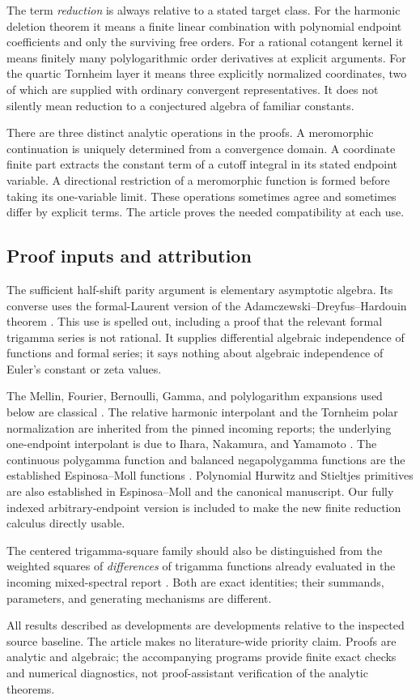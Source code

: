 The term \emph{reduction} is always relative to a stated target class.
For the harmonic deletion theorem it means a finite linear combination
with polynomial endpoint coefficients and only the surviving free
orders. For a rational cotangent kernel it means finitely many
polylogarithmic order derivatives at explicit arguments. For the
quartic Tornheim layer it means three explicitly normalized
coordinates, two of which are supplied with ordinary convergent
representatives. It does not silently mean reduction to a conjectured
algebra of familiar constants.

There are three distinct analytic operations in the proofs.
A meromorphic continuation is uniquely determined from a convergence
domain. A coordinate finite part extracts the constant term of a
cutoff integral in its stated endpoint variable. A directional
restriction of a meromorphic function is formed before taking its
one-variable limit. These operations sometimes agree and sometimes
differ by explicit terms. The article proves the needed compatibility
at each use.

\subsection{Proof inputs and attribution}

The sufficient half-shift parity argument is elementary asymptotic
algebra. Its converse uses the formal-Laurent version of the
Adamczewski--Dreyfus--Hardouin theorem
\cite[Theorem~1.2]{ghp:ADH}. This use is spelled out, including a
proof that the relevant formal trigamma series is not rational.
It supplies differential algebraic independence of functions and
formal series; it says nothing about algebraic independence of
Euler's constant or zeta values.

The Mellin, Fourier, Bernoulli, Gamma, and polylogarithm expansions
used below are classical \cite{DLMF}. The relative harmonic
interpolant and the Tornheim polar normalization are inherited from
the pinned incoming reports; the underlying one-endpoint
interpolant is due to Ihara, Nakamura, and Yamamoto \cite{harm:INY}.
The continuous polygamma function and balanced negapolygamma functions
are the established Espinosa--Moll functions \cite{EM}.
Polynomial Hurwitz and Stieltjes primitives are also established
in Espinosa--Moll \cite{harm:EM} and the canonical manuscript.
Our fully indexed arbitrary-endpoint version is included to make the
new finite reduction calculus directly usable.

The centered trigamma-square family should also be distinguished
from the weighted squares of \emph{differences} of trigamma functions
already evaluated in the incoming mixed-spectral report
\cite{source:Mixed}. Both are exact identities; their summands,
parameters, and generating mechanisms are different.

All results described as developments are developments relative to
the inspected source baseline. The article makes no literature-wide
priority claim. Proofs are analytic and algebraic; the accompanying
programs provide finite exact checks and numerical diagnostics, not
proof-assistant verification of the analytic theorems.
